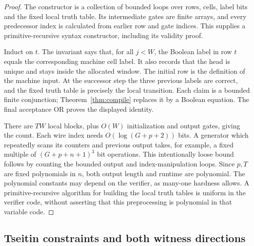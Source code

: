 \begin{proof}
The constructor is a collection of bounded loops over rows, cells, label
bits and the fixed local truth table. Its intermediate gates are finite
arrays, and every predecessor index is calculated from earlier row and gate
indices. This supplies a primitive-recursive syntax constructor, including
its validity proof.

Induct on \(t\). The invariant says that, for all \(j<W\), the Boolean
label in row \(t\) equals the corresponding machine cell label. It also
records that the head is unique and stays inside the allocated window.
The initial row is the definition of the machine input. At the successor
step the three previous labels are correct, and the fixed truth table is
precisely the local transition. Each claim is a bounded finite conjunction;
Theorem~\ref{thm:compile} replaces it by a Boolean equation. The final
acceptance OR proves the displayed identity.

There are \(TW\) local blocks, plus \(O(W)\) initialization and output
gates, giving the count. Each wire index needs
\(O(\log(G+p+2))\) bits. A generator which repeatedly scans its counters
and previous output takes, for example, a fixed multiple of
\((G+p+n+1)^3\) bit operations. This intentionally loose bound follows
by counting the bounded output and index-manipulation loops. Since \(p,T\)
are fixed polynomials in \(n\), both output length and runtime are
polynomial. The polynomial constants may depend on the verifier, as
many-one hardness allows. A primitive-recursive algorithm for building the
local truth tables is uniform in the verifier code, without asserting that
this preprocessing is polynomial in that variable code.
\end{proof}

\subsection{Tseitin constraints and both witness directions}

